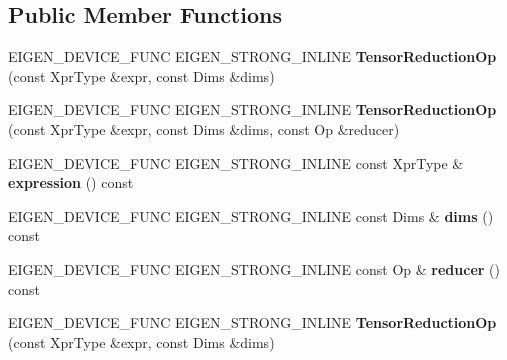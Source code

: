 \subsection*{Public Member Functions}
\begin{DoxyCompactItemize}
\item 
\mbox{\label{class_eigen_1_1_tensor_reduction_op_a5ef65e855f79840ce37ec745fb04d3fd}} 
E\+I\+G\+E\+N\+\_\+\+D\+E\+V\+I\+C\+E\+\_\+\+F\+U\+NC E\+I\+G\+E\+N\+\_\+\+S\+T\+R\+O\+N\+G\+\_\+\+I\+N\+L\+I\+NE {\bfseries Tensor\+Reduction\+Op} (const Xpr\+Type \&expr, const Dims \&dims)
\item 
\mbox{\label{class_eigen_1_1_tensor_reduction_op_a214ada0344528eada5fb7523d67381da}} 
E\+I\+G\+E\+N\+\_\+\+D\+E\+V\+I\+C\+E\+\_\+\+F\+U\+NC E\+I\+G\+E\+N\+\_\+\+S\+T\+R\+O\+N\+G\+\_\+\+I\+N\+L\+I\+NE {\bfseries Tensor\+Reduction\+Op} (const Xpr\+Type \&expr, const Dims \&dims, const Op \&reducer)
\item 
\mbox{\label{class_eigen_1_1_tensor_reduction_op_a5ae90ea3a6efb6fd49171598fd47158d}} 
E\+I\+G\+E\+N\+\_\+\+D\+E\+V\+I\+C\+E\+\_\+\+F\+U\+NC E\+I\+G\+E\+N\+\_\+\+S\+T\+R\+O\+N\+G\+\_\+\+I\+N\+L\+I\+NE const Xpr\+Type \& {\bfseries expression} () const
\item 
\mbox{\label{class_eigen_1_1_tensor_reduction_op_a1ddfefe2973adf8509faccae887417ec}} 
E\+I\+G\+E\+N\+\_\+\+D\+E\+V\+I\+C\+E\+\_\+\+F\+U\+NC E\+I\+G\+E\+N\+\_\+\+S\+T\+R\+O\+N\+G\+\_\+\+I\+N\+L\+I\+NE const Dims \& {\bfseries dims} () const
\item 
\mbox{\label{class_eigen_1_1_tensor_reduction_op_a0106ac777bdc6db703aaf02fe4e1874f}} 
E\+I\+G\+E\+N\+\_\+\+D\+E\+V\+I\+C\+E\+\_\+\+F\+U\+NC E\+I\+G\+E\+N\+\_\+\+S\+T\+R\+O\+N\+G\+\_\+\+I\+N\+L\+I\+NE const Op \& {\bfseries reducer} () const
\item 
\mbox{\label{class_eigen_1_1_tensor_reduction_op_a5ef65e855f79840ce37ec745fb04d3fd}} 
E\+I\+G\+E\+N\+\_\+\+D\+E\+V\+I\+C\+E\+\_\+\+F\+U\+NC E\+I\+G\+E\+N\+\_\+\+S\+T\+R\+O\+N\+G\+\_\+\+I\+N\+L\+I\+NE {\bfseries Tensor\+Reduction\+Op} (const Xpr\+Type \&expr, const Dims \&dims)

\end{DoxyCompactItemize}

